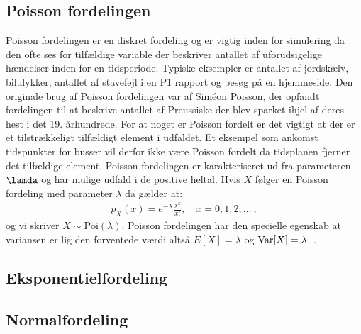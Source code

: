\subsection{Poisson fordelingen}
Poisson fordelingen er en diskret fordeling og er vigtig inden for simulering da den ofte ses for tilfældige variable der beskriver antallet af uforudsigelige hændelser inden for en tidsperiode. Typiske eksempler er antallet af jordskælv, bilulykker, antallet af stavefejl i en P1 rapport og besøg på en hjemmeside. Den originale brug af Poisson fordelingen var af Siméon Poisson, der opfandt fordelingen til at beskrive antallet af Preussiske der blev sparket ihjel af deres hest i det 19. århundrede. For at noget er Poisson fordelt er det vigtigt at der er et tilstrækkeligt tilfældigt element i udfaldet. Et eksempel som ankomst tidspunkter for busser vil derfor ikke være Poisson fordelt da tidsplanen fjerner det tilfældige element. Poisson fordelingen er karakteriseret ud fra parameteren $\lamda$ og har mulige udfald i de positive heltal. Hvis $X$ følger en Poisson fordeling med parameter $\lambda$ da gælder at:
\begin{align*}
p_X(x) = e^{-\lambda}\frac{\lambda^x}{x!}, \quad x = 0,1,2,\dots \ ,
\end{align*}
og vi skriver $X \sim \text{Poi}(\lambda)$. Poisson fordelingen har den specielle egenskab at variansen er lig den forventede værdi altså $E[X] = \lambda$ og $\operatorname{Var}[X] = \lambda$. 
\cite[117-120]{oflofsson2012}.
\subsection{Eksponentielfordeling}
\subsection{Normalfordeling}